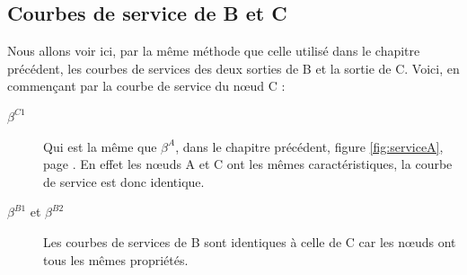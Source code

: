 \subsection{Courbes de service de B et C}\label{sub:courbesServiceB-C}
Nous allons voir ici, par la même méthode que celle utilisé dans le chapitre précédent, les courbes de services des deux sorties de B et la sortie de C. Voici, en commençant par la courbe de service du n\oe ud C :
\begin{description}
\item[$\beta^{C1}$] Qui est la même que $\beta^A$, dans le chapitre précédent, figure \ref{fig:serviceA}, page \pageref{fig:serviceA}. En effet les n\oe uds A et C ont les mêmes caractéristiques, la courbe de service est donc identique.
\item[$\beta^{B1}$ et $\beta^{B2}$] Les courbes de services de B sont identiques à celle de C car les n\oe uds ont tous les mêmes propriétés. 
\end{description}

